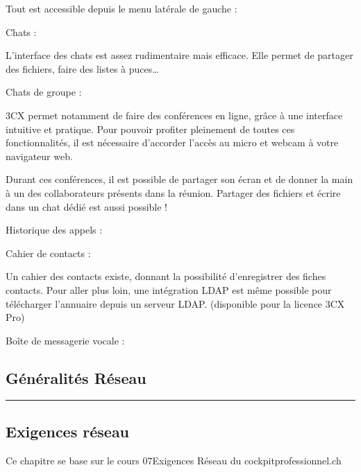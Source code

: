 \documentclass[letterpaper,10pt,french]{sphinxmanual}
\begin{document}
\sphinxAtStartPar
Tout est accessible depuis le menu latérale de gauche :

\noindent{}

\sphinxAtStartPar
Chats :

\sphinxAtStartPar
L’interface des chats est assez rudimentaire mais efficace.
Elle permet de partager des fichiers, faire des listes à puces…

\noindent{}

\sphinxAtStartPar
Chats de groupe :

\sphinxAtStartPar


\sphinxAtStartPar
3CX permet notamment de faire des conférences en ligne, grâce à une interface intuitive et pratique.
Pour pouvoir profiter pleinement de toutes ces fonctionnalités, il est nécessaire d’accorder l’accès au micro et webcam à votre navigateur web.

\sphinxAtStartPar
Durant ces conférences, il est possible de partager son écran et de donner la main à un des collaborateurs présents dans la réunion.
Partager des fichiers et écrire dans un chat dédié est aussi possible !

\noindent{}

\sphinxAtStartPar
Historique des appels :

\noindent{}

\sphinxAtStartPar
Cahier de contacts :

\sphinxAtStartPar
Un cahier des contacts existe, donnant la possibilité d’enregistrer des fiches contacts.
Pour aller plus loin, une intégration LDAP est même possible pour télécharger l’annuaire depuis un serveur LDAP. (disponible pour la licence 3CX Pro)

\noindent{}

\sphinxAtStartPar
Boîte de messagerie vocale :


\subsection{Généralités Réseau}
\label{\detokenize{Documentation-M362:generalites-reseau}}

\bigskip\hrule\bigskip



\subsection{Exigences réseau}
\label{\detokenize{Documentation-M362:exigences-reseau}}
\sphinxAtStartPar
Ce chapitre se base sur le cours 07\sphinxhyphen{}Exigences Réseau du cockpitprofessionnel.ch
\end{document}
